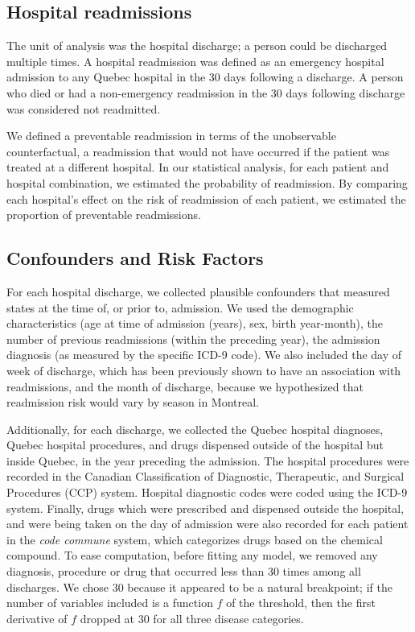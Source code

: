 \documentclass[]{article}\usepackage[]{graphicx}\usepackage[]{color}
\begin{document}
\subsection{Hospital readmissions}
The unit of analysis was the hospital discharge; a person could be discharged multiple times. A hospital readmission was defined as an emergency hospital admission to any Quebec hospital in the 30 days following a discharge.  A person who died or had a non-emergency readmission in the 30 days following discharge was considered not readmitted. 

We defined a preventable readmission in terms of the unobservable counterfactual, a readmission that would not have occurred if the patient was treated at a different hospital. In our statistical analysis, for each patient and hospital combination, we estimated the probability of readmission. By comparing each hospital's effect on the risk of readmission of each patient, we estimated the proportion of preventable readmissions.

\subsection{Confounders and Risk Factors}
For each hospital discharge, we collected plausible confounders that measured states at the time of, or prior to, admission. We used the demographic characteristics (age at time of admission (years), sex, birth year-month), the number of previous readmissions (within the preceding year), the admission diagnosis (as measured by the specific ICD-9 code). We also included the day of week of discharge, which has been previously shown to have an association with readmissions\supercite{van_walraven_risk_2002}, and the month of discharge, because we hypothesized that readmission risk would vary by season in Montreal.

Additionally, for each discharge, we collected the Quebec hospital diagnoses, Quebec hospital procedures, and drugs dispensed outside of the hospital but inside Quebec, in the year preceding the admission. The hospital procedures were recorded in the Canadian Classification of Diagnostic, Therapeutic, and Surgical Procedures (CCP) system. Hospital diagnostic codes were coded using the ICD-9 system. Finally, drugs which were prescribed and dispensed outside the hospital, and were being taken on the day of admission were also recorded for each patient in the \emph{code commune} system, which categorizes drugs based on the chemical compound. To ease computation, before fitting any model, we removed any diagnosis, procedure or drug that occurred less than 30 times among all discharges. We chose 30 because it appeared to be a natural breakpoint; if the number of variables included is a function $f$ of the threshold, then the first derivative of $f$ dropped at 30 for all three disease categories.
\end{document}
